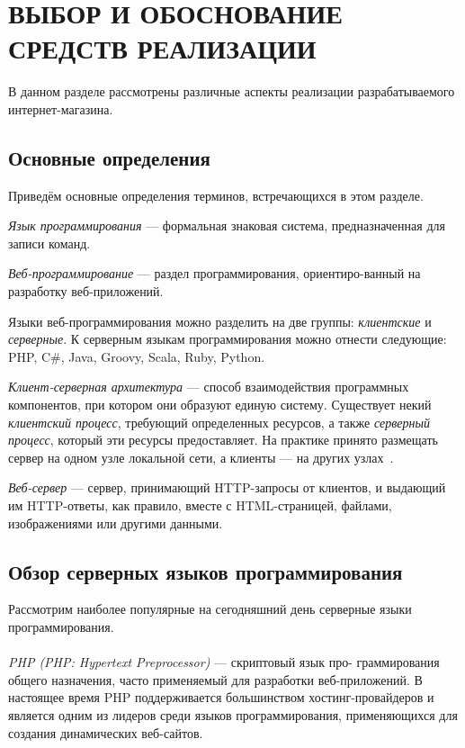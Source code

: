 \section[Выбор и обоснование средств реализации]{ВЫБОР И ОБОСНОВАНИЕ \\ СРЕДСТВ РЕАЛИЗАЦИИ}

В данном разделе рассмотрены различные аспекты реализации разрабатываемого интернет-магазина.

\subsection{Основные определения}
\label{sub:choice_theory}

Приведём основные определения терминов, встречающихся в этом разделе.

\textit{Язык программирования} --- формальная знаковая система, предназначенная для записи команд.

\textit{Веб-программирование} --- раздел программирования, ориентиро-ванный на разработку веб-приложений.

Языки веб-программирования можно разделить на две группы: \textit{клиентские}
и \textit{серверные}. К серверным языкам программирования можно
отнести следующие: PHP, C\#, Java, Groovy, Scala, Ruby, Python.

\textit{Клиент-серверная архитектура} --- способ взаимодействия программных компонентов,
при котором они образуют единую систему. Существует некий \textit{клиентский процесс},
требующий определенных ресурсов, а также \textit{серверный процесс}, который
эти ресурсы предоставляет. На практике принято размещать сервер на одном узле локальной сети,
а клиенты --- на других узлах~\cite{konnolli03}.

\textit{Веб-сервер} --- сервер, принимающий HTTP-запросы от клиентов, и выдающий им
HTTP-ответы, как правило, вместе с HTML-страницей, файлами, изображениями или другими данными.

\subsection{Обзор серверных языков программирования}
\label{sub:choice_server_language}

Рассмотрим наиболее популярные на сегодняшний день серверные языки программирования.

\paragraph{}
\textit{PHP (PHP: Hypertext Preprocessor)} --- скриптовый язык про-
граммирования общего назначения, часто применяемый для разработки веб-приложений.
В настоящее время PHP поддерживается большинством хостинг-провайдеров
и является одним из лидеров среди языков программирования, применяющихся для создания
динамических веб-сайтов.

